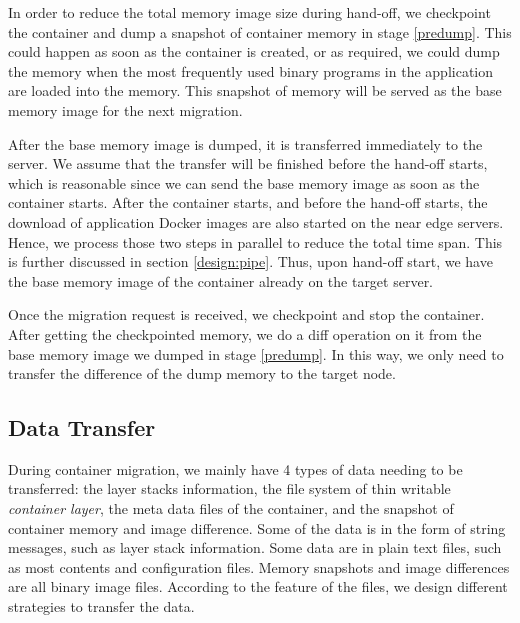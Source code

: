 In order to reduce the total memory image size during hand-off, we checkpoint the container and dump a snapshot of container memory in stage \ref{predump}. This could happen as soon as the container is created, or as required, we could dump the memory when the most frequently used binary programs in the application are loaded into the memory. This snapshot of memory will be served as the base memory image for the next migration.

After the base memory image is dumped, it is transferred immediately to the server. We assume that the transfer will be finished before the hand-off starts, which is reasonable since we can send the base memory image as soon as the container starts. 
After the container starts, and before the hand-off starts, the download of application Docker images are also started on the near edge servers. 
Hence, we process those two steps in parallel to reduce the total time span. This is further discussed in section \ref{design:pipe}. Thus, upon hand-off start, we have the base memory image of the container already on the target server. 

Once the migration request is received, we checkpoint and stop the container. After getting the checkpointed memory, we do a diff operation on it from the base memory image we dumped in stage \ref{predump}. 
In this way, we only need to transfer the difference of the dump memory to the target node. 

\subsection{Data Transfer}\label{design:compression}

During container migration, we mainly have 4 types of data needing to be transferred:
the layer stacks information, the file system of thin writable \textit{container layer}, the meta data files of the container, and the snapshot of container memory and image difference. Some of the data is in the form of string messages, such as layer stack information. Some data are in plain text files, such as most contents and configuration files. Memory snapshots and image differences are all binary image files. According to the feature of the files, we design different strategies to transfer the data.

